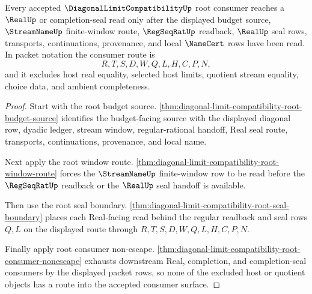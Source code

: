 \begin{theorem}
\label{thm:diagonal-limit-compatibility-root-budget-seal-factorization}
Every accepted $\DiagonalLimitCompatibilityUp$ root consumer reaches a $\RealUp$ or completion-seal read only after the displayed budget source, $\StreamNameUp$ finite-window route, $\RegSeqRatUp$ readback, $\RealUp$ seal rows, transports, continuations, provenance, and local $\NameCert$ rows have been read. In packet notation the consumer route is
$$
R,T,S,D,W,Q,L,H,C,P,N,
$$
and it excludes host real equality, selected host limits, quotient stream equality, choice data, and ambient completeness.
\end{theorem}
\begin{proof}
Start with the root budget source. \autoref{thm:diagonal-limit-compatibility-root-budget-source} identifies the budget-facing source with the displayed diagonal row, dyadic ledger, stream window, regular-rational handoff, Real seal route, transports, continuations, provenance, and local name.

Next apply the root window route. \autoref{thm:diagonal-limit-compatibility-root-window-route} forces the $\StreamNameUp$ finite-window row to be read before the $\RegSeqRatUp$ readback or the $\RealUp$ seal handoff is available.

Then use the root seal boundary. \autoref{thm:diagonal-limit-compatibility-root-seal-boundary} places each Real-facing read behind the regular readback and seal rows $Q,L$ on the displayed route through $R,T,S,D,W,Q,L,H,C,P,N$.

Finally apply root consumer non-escape. \autoref{thm:diagonal-limit-compatibility-root-consumer-nonescape} exhausts downstream Real, completion, and completion-seal consumers by the displayed packet rows, so none of the excluded host or quotient objects has a route into the accepted consumer surface.
\end{proof}

